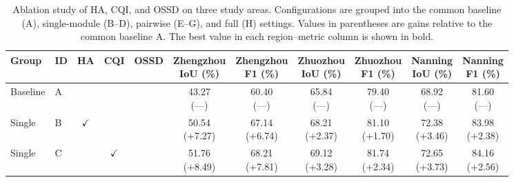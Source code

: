 \documentclass[authoryear,preprint,12pt]{elsarticle}
\begin{document}
\begin{table}[!htbp]
\centering
\comparisonfont
\captionsetup{name=Table,font=comparisoncaption,labelfont=bf,labelsep=newline,justification=raggedright,singlelinecheck=false}
\caption{Ablation study of HA, CQI, and OSSD on three study areas. Configurations are grouped into the common baseline (A), single-module (B–D), pairwise (E–G), and full (H) settings. Values in parentheses are gains relative to the common baseline A. The best value in each region–metric column is shown in bold.}
\label{tab:ablation_modules}
\fontsize{8}{10}\selectfont
\setlength{\tabcolsep}{3pt}
\renewcommand{\arraystretch}{1.2}
\begin{adjustbox}{max width=\linewidth}
\begin{tabular}{@{}llccc*{6}{c}@{}}
\toprule
Group & ID & HA & CQI & OSSD & \makecell{Zhengzhou\\IoU (\%)} & \makecell{Zhengzhou\\F1 (\%)} & \makecell{Zhuozhou\\IoU (\%)} & \makecell{Zhuozhou\\F1 (\%)} & \makecell{Nanning\\IoU (\%)} & \makecell{Nanning\\F1 (\%)} \\
\midrule
Baseline & A &  &  &  & \makecell{43.27\\(—)} & \makecell{60.40\\(—)} & \makecell{65.84\\(—)} & \makecell{79.40\\(—)} & \makecell{68.92\\(—)} & \makecell{81.60\\(—)} \\
\midrule
Single & B & \(\checkmark\) &  &  & \makecell{50.54\\(+7.27)} & \makecell{67.14\\(+6.74)} & \makecell{68.21\\(+2.37)} & \makecell{81.10\\(+1.70)} & \makecell{72.38\\(+3.46)} & \makecell{83.98\\(+2.38)} \\
Single & C &  & \(\checkmark\) &  & \makecell{51.76\\(+8.49)} & \makecell{68.21\\(+7.81)} & \makecell{69.12\\(+3.28)} & \makecell{81.74\\(+2.34)} & \makecell{72.65\\(+3.73)} & \makecell{84.16\\(+2.56)} \\

\end{tabular}
\end{adjustbox}
\end{table}
\end{document}
